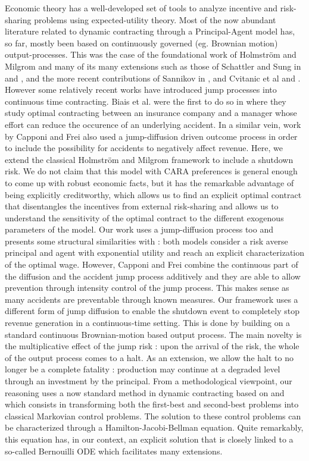 \documentclass[numbook, envcountsect, envcountsame, envcountreset, runningheads, smallextended]{article}
\begin{document}
Economic theory has a well-developed set of tools to analyze incentive and risk-sharing problems using expected-utility theory. Most of the now abundant literature related to dynamic contracting through a Principal-Agent model has, so far, mostly been based on continuously governed (eg. Brownian motion) output-processes. This was the case of the foundational work of Holmström and Milgrom \cite{HM} and many of its many extensions such as those of Schattler and Sung in \cite{SS} and \cite{SSung97}, and the more recent contributions of Sannikov in \cite{Sannikov08}, and Cvitanic et al \cite{CXZ} and \cite{CPT:18}. However some relatively recent works have introduced jump processes into continuous time contracting. Biais et al. were the first to do so in \cite{Biais} where they study optimal contracting between an insurance company and a manager whose effort can reduce the occurence of an underlying accident.  In a similar vein, work by Capponi and Frei \cite{CF} also used a jump-diffusion driven outcome process in order to include the possibility for accidents to negatively affect revenue. 
Here, we extend the classical Holmström and Milgrom \cite{HM} framework to include a shutdown risk.  We do not claim that this model with CARA preferences is general  enough to come up with robust economic facts, but it has the remarkable advantage of being explicitly creditworthy, which allows us to find an explicit optimal contract that disentangles the incentives  from external risk-sharing and allows us to understand the sensitivity of the optimal contract to the different exogenous parameters of the model. Our work uses a jump-diffusion process too and presents some structural similarities with \cite{CF} : both models consider a risk averse principal and agent with exponential utility and reach an explicit characterization of the optimal wage. However, Capponi and Frei combine the continuous part of the diffusion and the accident jump process additively and they are able to allow prevention through intensity control of the jump process. This makes sense as many accidents are preventable through known measures. Our framework uses a different form of jump diffusion to enable the shutdown event to completely stop revenue generation in a continuous-time setting. This is done by building on a standard continuous Brownian-motion based output process. The main novelty is the multiplicative effect of the jump risk : upon the arrival of the risk, the whole of the output process comes to a halt. As an extension, we allow the halt to no longer be a complete fatality : production may continue at a degraded level through an investment by the principal.  From a methodological viewpoint, our reasoning uses a now standard method in dynamic contracting based on \cite{Sannikov08} and \cite{CPT:18} which consists in transforming both the first-best and second-best problems into classical Markovian control problems. The solution to these control problems can be characterized through a Hamilton-Jacobi-Bellman equation. Quite remarkably, this equation has, in our context, an explicit solution that is closely linked to a so-called Bernouilli ODE which facilitates many extensions. \\
\end{document}
